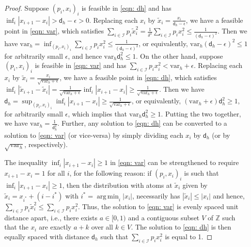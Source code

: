\documentclass[11pt]{article}
\newcommand{\calI}{\mathcal{I}}
\newcommand{\var}{\mathrm{var}}
\newcommand{\bbZ}{\mathbb{Z}}
\newcommand{\dist}{\mathsf{d}}
\DeclareMathOperator*{\argmin}{arg\,min}
\begin{document}
\begin{proof}
		Suppose $(p_i, x_i)_i$ is feasible in \eqref{eqn: dh} and has $\inf_i |x_{i+1} - x_i| > \dist_h - \epsilon > 0$. Replacing each $x_i$ by $\tilde x_i = \frac{x_i}{\dist_h - \epsilon}$, we have a feasible point in \eqref{eqn: var}, which satisfies $\sum_{i \in \calI} p_i \tilde x_i^2 = \frac{1}{\delta^2} \sum_{i \in \calI} p_i x_i^2 \leq \frac{1}{(\dist_h - \epsilon)^2}$.  Then we have  $\var_h = \inf_{(p_i, x_i)_i} \sum_{i \in \calI} p_i x_i^2 \leq \frac{1}{(\dist_h - \epsilon)^2}$, or equivalently, $\var_h (\dist_h - \epsilon)^2 \leq 1$ for arbitrarily small $\epsilon$, and hence $\var_h \dist_h^2 \leq 1$. 
		On the other hand, suppose $(p_i, x_i)_i$ is feasible in \eqref{eqn: var} and has $\sum_{i \in \calI} p_ix_i^2 < \var_h + \epsilon$. Replacing each $x_i$ by $\tilde x_i = \frac{x_i}{\sqrt{\var_h + \epsilon}}$, we have a feasible point in \eqref{eqn: dh}, which satisfies $\inf_i |\tilde x_{i+1} - \tilde x_i| = \frac{1}{\sqrt{\var_h + \epsilon}}\inf_i |x_{i+1} - x_i| \geq \frac{1}{\sqrt{\var_h + \epsilon}}$. Then we have $\dist_h = \sup_{(p_i, x_i)_i} \inf_i |x_{i+1} - x_i| \geq \frac{1}{\sqrt{\var_h + \epsilon}}$, or equivalently, $(\var_h + \epsilon)\dist_h^2 \geq 1$, for arbitrarily small $\epsilon$, which implies that $\var_h \dist_h^2 \geq 1$. Putting the two together, we have $\var_h = \frac{1}{\dist_h^2}$. Further, any solution to \eqref{eqn: dh} can be converted to a solution to \eqref{eqn: var} (or vice-versa) by simply dividing each $x_i$ by $\dist_h$ (or by $\sqrt{\var_h}$, respectively). 
		
		The inequality $\inf_i |x_{i+1} - x_i| \geq 1$ in \eqref{eqn: var} can be strengthened to require $x_{i+1}-x_i = 1$ for all $i$, for the following reason: if $(p_i, x_i)_i$ is such that $\inf_i |x_{i+1} - x_i| \geq 1$, then the distribution with atoms at $\tilde x_i$ given by $\tilde x_{i} = x_{i^*} + (i - i^*)$ with $i^* = \argmin_{i} |x_i|$, necessarily has $|\tilde x_i| \leq |x_i|$ and hence, $\sum_{i \in \calI} p_i \tilde x_i^2 \leq \sum_{i \in \calI} p_i x_i^2$.
		Thus, the solution to \eqref{eqn: var} is evenly spaced unit distance apart, i.e., 
		there exists $a \in [0,1)$ and a contiguous subset $V$ of $\bbZ$ such that 
		the $x_i$ are exactly $a + k$ over all $k \in V$. The solution to \eqref{eqn: dh} is then equally spaced with distance $\dist_h$ such that $\sum_{i \in \calI} p_i x_i^2$ is equal to 1.     
		

\end{proof}
\end{document}
